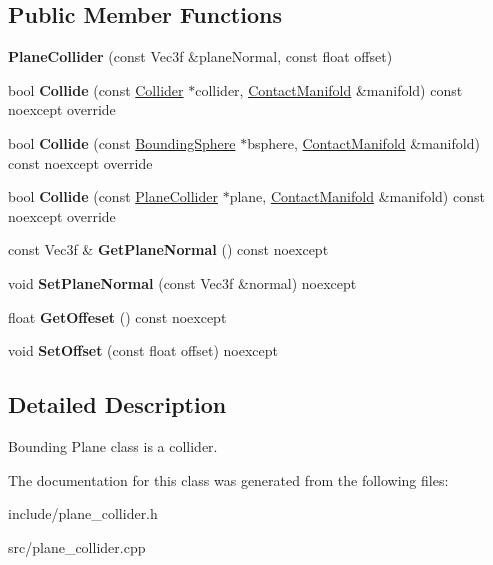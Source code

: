 \subsection*{Public Member Functions}
\begin{DoxyCompactItemize}
\item 
\mbox{\label{class_blade_1_1_plane_collider_afde68d33241cd30bc0a68c29ba5ab177}} 
{\bfseries Plane\+Collider} (const Vec3f \&plane\+Normal, const float offset)
\item 
\mbox{\label{class_blade_1_1_plane_collider_a0eec57eec3a14a57ddbb14549e3f4de8}} 
bool {\bfseries Collide} (const \hyperlink{class_blade_1_1_collider}{Collider} $\ast$collider, \hyperlink{class_blade_1_1_contact_manifold}{Contact\+Manifold} \&manifold) const noexcept override
\item 
\mbox{\label{class_blade_1_1_plane_collider_a41656313053cd2529b0815deb94d2713}} 
bool {\bfseries Collide} (const \hyperlink{class_blade_1_1_bounding_sphere}{Bounding\+Sphere} $\ast$bsphere, \hyperlink{class_blade_1_1_contact_manifold}{Contact\+Manifold} \&manifold) const noexcept override
\item 
\mbox{\label{class_blade_1_1_plane_collider_a06dbb0b93993c13c36b9fcfcdfa2a19b}} 
bool {\bfseries Collide} (const \hyperlink{class_blade_1_1_plane_collider}{Plane\+Collider} $\ast$plane, \hyperlink{class_blade_1_1_contact_manifold}{Contact\+Manifold} \&manifold) const noexcept override
\item 
\mbox{\label{class_blade_1_1_plane_collider_a34f5aed7ac8bf8fde0d7e4b2981d6468}} 
const Vec3f \& {\bfseries Get\+Plane\+Normal} () const noexcept
\item 
\mbox{\label{class_blade_1_1_plane_collider_a7c958fc80ebb794cbe9b321335ab1a7c}} 
void {\bfseries Set\+Plane\+Normal} (const Vec3f \&normal) noexcept
\item 
\mbox{\label{class_blade_1_1_plane_collider_aa139681f2b510ca30dd86e0c9e22d919}} 
float {\bfseries Get\+Offeset} () const noexcept
\item 
\mbox{\label{class_blade_1_1_plane_collider_a858ff3ff302c656cf1d0b0387802588d}} 
void {\bfseries Set\+Offset} (const float offset) noexcept
\end{DoxyCompactItemize}


\subsection{Detailed Description}
Bounding Plane class is a collider. 

The documentation for this class was generated from the following files\+:\begin{DoxyCompactItemize}
\item 
include/plane\+\_\+collider.\+h\item 
src/plane\+\_\+collider.\+cpp\end{DoxyCompactItemize}
